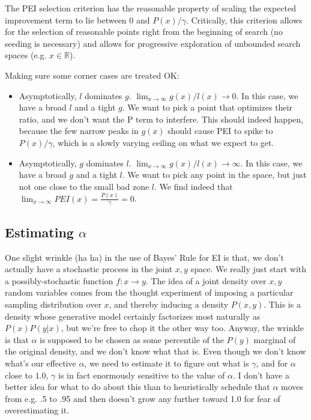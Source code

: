 \documentclass{article}
\begin{document}
    The PEI selection criterion has the reasonable property of scaling the expected improvement term to lie between 0 and $P(x)/\gamma$.
    Critically, this criterion allows for the selection of reasonable points right from the beginning of search (no seeding is necessary)
    and allows for progressive exploration of unbounded search spaces (e.g. $x \in \mathbb{R}$).

    Making sure some corner cases are treated OK:
    \begin{itemize}
    \item Asymptotically, $l$ dominates $g$. 
        $\lim_{x \rightarrow \infty} g(x) / l(x) \rightarrow 0$.
        In this case, we have a broad $l$ and a tight $g$. We want to pick a point that optimizes their ratio, and we don't want the P term to interfere.
        This should indeed happen, because the few narrow peaks in $g(x)$ should cause PEI to spike to $P(x)/\gamma$, which is a slowly varying ceiling on what we expect to get.
    \item Asymptotically, $g$ dominates $l$.
        $\lim_{x \rightarrow \infty} g(x) / l(x) \rightarrow \infty$.
        In this case, we have a broad $g$ and a tight $l$. We want to pick any point in the space, but just not one close to the small bad zone $l$.
        We find indeed that $\lim_{x \rightarrow \infty} PEI(x) = \frac{P(x)}{\gamma} = 0$.
    \end{itemize}


\subsection{Estimating $\alpha$}

    One slight wrinkle (ha ha) in the use of Bayes' Rule for EI is that, we don't actually have a stochastic process in the joint $x, y$ space.
    We really just start with a possibly-stochastic function $f:x \rightarrow y$.
    The idea of a joint density over $x, y$ random variables comes from the thought experiment of imposing a particular sampling distribution over $x$,
    and thereby inducing a density $P(x, y)$. 
    This is a density whose generative model certainly factorizes most naturally as $P(x)P(y|x)$, but we're free to chop it the other way too.
    Anyway, the wrinkle is that $\alpha$ is supposed to be chosen as some percentile of the $P(y)$ marginal of the original density,
    and we don't know what that is.
    Even though we don't know what's our effective $\alpha$, we need to estimate it to figure out what is $\gamma$, and for $\alpha$ close to $1.0$, $\gamma$ is 
    in fact enormously sensitive to the value of $\alpha$.
    I don't have a better idea for what to do about this than to heuristically
    schedule that $\alpha$ moves from e.g. .5 to .95 and then doesn't grow any further toward 1.0 for fear of overestimating it.
\end{document}
